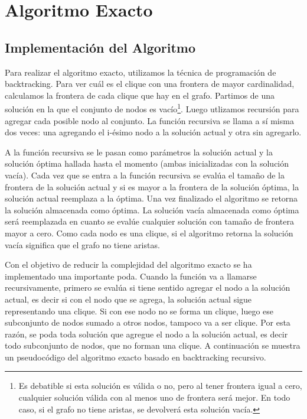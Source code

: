 \section{Algoritmo Exacto}
\subsection{Implementación del Algoritmo}

\par{Para realizar el algoritmo exacto, utilizamos la técnica de programación de
backtracking. Para ver cuál es el clique con una frontera de mayor
cardinalidad, calculamos la frontera de cada clique que hay en el grafo.
Partimos de una solución en la que el conjunto de nodos es vacío\footnote{
Es debatible si esta solución es válida o no, pero al tener frontera igual
a cero, cualquier solución válida con al menos uno de frontera será mejor.
En todo caso, si el grafo no tiene aristas, se devolverá esta solución vacía.}.
Luego utlizamos recursión para agregar cada posible nodo al conjunto. La
función recursiva se llama a sí misma dos veces: una agregando el i-ésimo
nodo a la solución actual y otra sin agregarlo.}\\

\par{A la función recursiva se le pasan como parámetros la solución actual y
la solución óptima hallada hasta el momento (ambas inicializadas con la
solución vacía). Cada vez que se entra a la función recursiva se evalúa el
tamaño de la frontera de la solución actual y si es mayor a la frontera de
la solución óptima, la solución actual reemplaza a la óptima. Una vez
finalizado el algoritmo se retorna la solución almacenada como óptima. La
solución vacía almacenada como óptima será reemplazada en cuanto se evalúe
cualquier solución con tamaño de frontera mayor a cero. Como cada nodo es una
clique, si el algoritmo retorna la solución vacía significa que el grafo no
tiene aristas.}\\

\par{Con el objetivo de reducir la complejidad del algoritmo exacto se ha
implementado una importante poda. Cuando la función va a llamarse
recursivamente, primero se evalúa si tiene sentido agregar el nodo a la
solución actual, es decir si con el nodo que se agrega, la solución actual
sigue representando una clique. Si con ese nodo no se
forma un clique, luego ese subconjunto de nodos sumado a otros nodos, tampoco
va a ser clique. Por esta razón, se poda toda solución que agregue el nodo
a la solución actual, es decir todo subconjunto de nodos, que no forman una
clique. A continuación se muestra un pseudocódigo del algoritmo exacto basado
en backtracking recursivo.}\\

